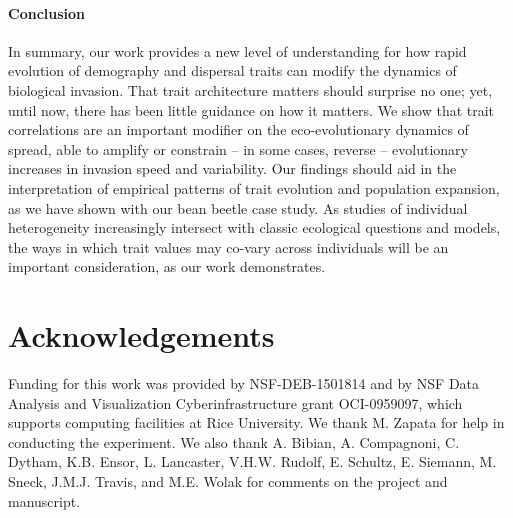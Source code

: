 \documentclass[11pt]{article}
\begin{document}
\paragraph*{Conclusion}
In summary, our work provides a new level of understanding for how rapid evolution of demography and dispersal traits can modify the dynamics of biological invasion.
That trait architecture matters should surprise no one; yet, until now, there has been little guidance on how it matters. 
We show that trait correlations are an important modifier on the eco-evolutionary dynamics of spread, able to amplify or constrain -- in some cases, reverse -- evolutionary increases in invasion speed and variability. 
Our findings should aid in the interpretation of empirical patterns of trait evolution and population expansion, as we have shown with our bean beetle case study. 
As studies of individual heterogeneity increasingly intersect with classic ecological questions and models, the ways in which trait values may co-vary across individuals will be an important consideration, as our work demonstrates. 

\section*{Acknowledgements}
Funding for this work was provided by NSF-DEB-1501814 and by NSF Data Analysis and Visualization Cyberinfrastructure grant OCI-0959097, which supports computing facilities at Rice University. We thank M. Zapata for help in conducting the experiment. We also thank A. Bibian, A. Compagnoni, C. Dytham, K.B. Ensor, L. Lancaster, V.H.W. Rudolf, E. Schultz, E. Siemann, M. Sneck, J.M.J. Travis, and M.E. Wolak for comments on the project and manuscript.

\newpage{}
\end{document}
